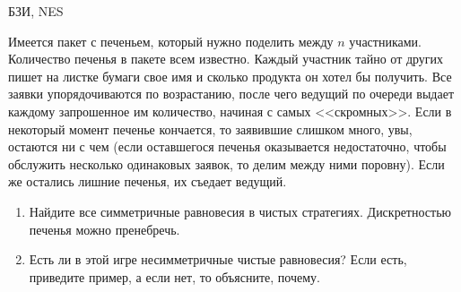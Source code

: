 \begin{problem}
\begin{source}
БЗИ, NES
\end{source} Имеется пакет с печеньем,
который нужно поделить между $n$ участниками. Количество
печенья в пакете всем известно. Каждый участник тайно от
других пишет на листке бумаги свое имя и сколько продукта
он хотел бы получить. Все заявки упорядочиваются по
возрастанию, после чего ведущий по очереди выдает каждому
запрошенное им количество, начиная с самых <<скромных>>.
Если в некоторый момент печенье кончается, то заявившие
слишком много, увы, остаются ни с чем (если оставшегося
печенья оказывается недостаточно, чтобы обслужить несколько
одинаковых заявок, то делим между ними поровну). Если же
остались лишние печенья, их съедает ведущий.

\begin{enumerate}

\item Найдите все симметричные равновесия в чистых
стратегиях. Дискретностью печенья можно пренебречь.

\item Есть ли в этой игре несимметричные чистые равновесия?
Если есть, приведите пример, а если нет, то объясните,
почему.

\end{enumerate}







\begin{sol}

\end{sol}
\end{problem}










